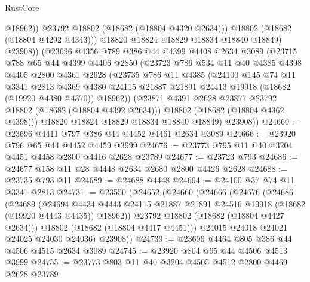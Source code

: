\begin{lexlean}{RustCore}
\begin{coremodule}
                    @18962))
                @23792
                @18802
                (@18682 (@18804 @4320 @2634)))
              @18802
              (@18682 (@18804 @4292 @4343)))
            @18820
            @18824
            @18829
            @18834
            @18840
            @18849)
          @23908))
      (@23696
        @4356
        @789
        @386
        @44
        @4399
        @4408
        @2634
        @3089
        (@23715
          @788
          @65
          @44
          @4399
          @4406
          @2850
          (@23723
            @786
            @534
            @11
            @40
            @4385
            @4398
            @4405
            @2800
            @4361
            @2628
            (@23735
              @786
              @11
              @4385
              (@24100
                @145
                @74
                @11
                @3341
                @2813
                @4369
                @4380
                @24115
                @21887
                @21891
                @24413
                @19918
                (@18682 (@19920 @4380 @4370))
                @18962))
            (@23871 @4391 @2628 @23877 @23792 @18802 (@18682 (@18804 @4392 @2634)))
            @18802
            (@18682 (@18804 @4362 @4398)))
          @18820
          @18824
          @18829
          @18834
          @18840
          @18849)
        @23908))
@24660 := @23696 @4411 @797 @386 @44 @4452 @4461 @2634 @3089
@24666 := @23920 @796 @65 @44 @4452 @4459 @3999
@24676 := @23773 @795 @11 @40 @3204 @4451 @4458 @2800 @4416 @2628 @23789
@24677 := @23723 @793
@24686 := @24677 @158 @11 @28 @4448 @2634 @2680 @2800 @4426 @2628
@24688 := @23735 @793 @11
@24689 := @24688 @4448
@24694 := @24100 @37 @74 @11 @3341 @2813
@24731 := @23550
    (@24652
      (@24660
        (@24666
          (@24676
            (@24686
              (@24689
                (@24694
                  @4434
                  @4443
                  @24115
                  @21887
                  @21891
                  @24516
                  @19918
                  (@18682 (@19920 @4443 @4435))
                  @18962))
              @23792
              @18802
              (@18682 (@18804 @4427 @2634)))
            @18802
            (@18682 (@18804 @4417 @4451)))
          @24015
          @24018
          @24021
          @24025
          @24030
          @24036)
        @23908))
@24739 := @23696 @4464 @805 @386 @44 @4506 @4515 @2634 @3089
@24745 := @23920 @804 @65 @44 @4506 @4513 @3999
@24755 := @23773 @803 @11 @40 @3204 @4505 @4512 @2800 @4469 @2628 @23789

\end{coremodule}
\end{lexlean}
